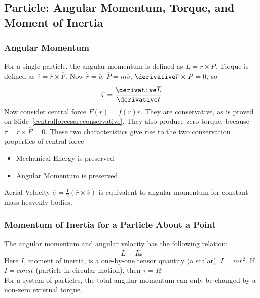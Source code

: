 \subsection{Particle: Angular Momentum, Torque, and Moment of Inertia}
\begin{frame}
\frametitle{Angular Momentum}
For a single particle, the \alert{angular momentum} is defined as $\overline{L}=\overline{r}\times\overline{P}$. \alert{Torque} is defined as $\overline\tau=\overline r\times\overline F$. Now $\dot{\overline r}=\overline v$, $\overline P=m\overline v$, $\derivative \overline r\times\overline P=0$, so \begin{equation}\label{eq:angularmomentumandtorque}\overline\tau=\frac{\derivative\overline L}{\derivative t}\end{equation}
Now consider central force $\overline F (\overline r)=f(r)\overline r$. They are \alert{conservative}, as is proved on Slide~\ref{centralforcesareconservative}. They also produce \alert{zero torque}, because $\tau=\overline r\times\overline F=0$. These two characteristics give rise to the two conservation \alert{properties} of central force
\begin{itemize}
\item \alert{Mechanical Energy} is preserved
\item \alert{Angular Momentum} is preserved
\end{itemize}
\alert{Aerial Velocity} $\overline\sigma=\frac{1}{2}(\overline r\times\overline v)$ is equivalent to angular momentum for constant-mass heavenly bodies.
\end{frame}
\begin{frame}
\frametitle{Momentum of Inertia for a Particle About a Point}
The angular momentum and angular velocity has the following relation:
\[\overline L=I\overline\omega\]
Here $I$, \alert{moment of inertia}, is a one-by-one tensor quantity (a scalar). $I=mr^2$. If $I=const$ (particle in circular motion), then 
$\overline\tau=I\overline\varepsilon$\\
For a \alert{system} of particles, the \alert{total} angular momentum can only be changed by a non-zero \alert{external} torque.
\end{frame}
